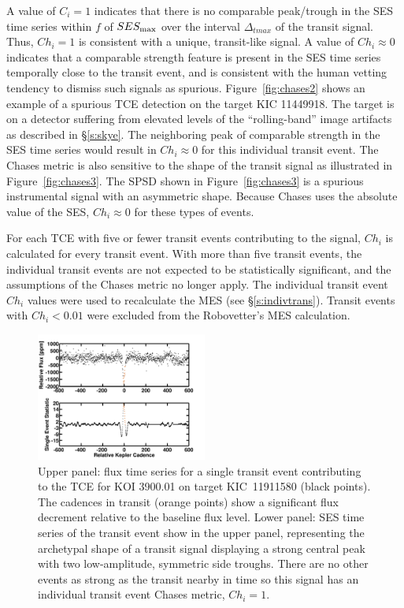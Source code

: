 A value of $C_{i}=1$ indicates that there is no comparable peak/trough in the SES time series within $f$ of $SES_{\rm max}$ over the interval $\Delta_{tmax}$ of the transit signal.  Thus, $Ch_{i}=1$ is consistent with a unique, transit-like signal.  A value of $Ch_{i}\approx0$ indicates that a comparable strength feature is present in the SES time series temporally close to the transit event, and is consistent with the human vetting tendency to dismiss such signals as spurious.  Figure~\ref{fig:chases2} shows an example of a spurious TCE detection on the target KIC 11449918.  The target is on a detector suffering from elevated levels of the ``rolling-band'' image artifacts as described in \S\ref{s:skye}.  The neighboring peak of comparable strength in the SES time series would result in $Ch_{i}\approx0$ for this individual transit event.  The Chases metric is also sensitive to the shape of the transit signal as illustrated in Figure~\ref{fig:chases3}. The SPSD shown in Figure~\ref{fig:chases3} is a spurious instrumental signal with an asymmetric shape. Because Chases uses the absolute value of the SES, $Ch_{i}\approx0$ for these types of events.


For each TCE with five or fewer transit events contributing to the signal, $Ch_{i}$ is calculated for every transit event.  With more than five transit events, the individual transit events are not expected to be statistically significant, and the assumptions of the Chases metric no longer apply. The individual transit event $Ch_{i}$ values were used to recalculate the MES (see \S\ref{s:indivtrans}). Transit events with $Ch_{i}<0.01$ were excluded from the Robovetter's MES calculation.

\begin{figure}[htb]
\includegraphics[width=0.5\textwidth]{kic11911580_cleanhighsnr.png}
\caption{Upper panel: flux time series for a single transit event contributing to the TCE for KOI 3900.01 on target KIC~11911580 (black points).  The cadences in transit (orange points) show a significant flux decrement relative to the baseline flux level.  Lower panel: SES time series of the transit event show in the upper panel, representing the archetypal shape of a transit signal displaying a strong central peak with two low-amplitude, symmetric side troughs. There are no other events as strong as the transit nearby in time so this signal has an individual transit event Chases metric, $Ch_{i}=1$.}
\label{fig:chases1}
\end{figure}

